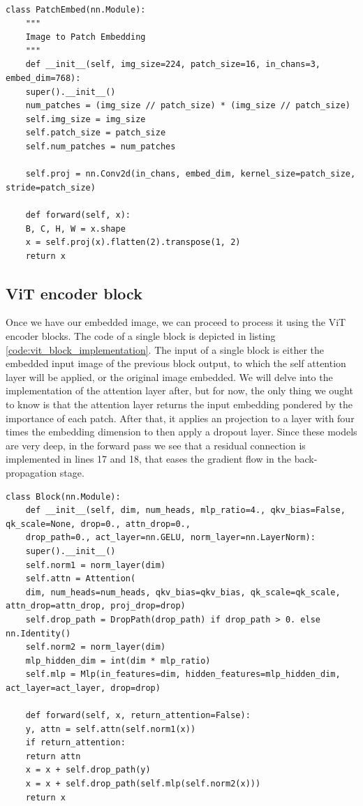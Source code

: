 \begin{lstlisting}[caption={Patch Embedding module}, label={code:patch_embedding}]
	class PatchEmbed(nn.Module):
	""" 
	Image to Patch Embedding
	"""
	def __init__(self, img_size=224, patch_size=16, in_chans=3, embed_dim=768):
	super().__init__()
	num_patches = (img_size // patch_size) * (img_size // patch_size)
	self.img_size = img_size
	self.patch_size = patch_size
	self.num_patches = num_patches
	
	self.proj = nn.Conv2d(in_chans, embed_dim, kernel_size=patch_size, stride=patch_size)
	
	def forward(self, x):
	B, C, H, W = x.shape
	x = self.proj(x).flatten(2).transpose(1, 2)
	return x
\end{lstlisting}

\subsection{ViT encoder block}
Once we have our embedded image, we can proceed to process it using the ViT encoder blocks. The code of a single block is depicted in listing \ref{code:vit_block_implementation}. The input of a single block is either the embedded input image of the previous block output, to which the self attention layer will be applied, or the original image embedded. We will delve into the implementation of the attention layer after, but for now, the only thing we ought to know is that the attention layer returns the input embedding pondered by the importance of each patch. After that, it applies an projection to a layer with four times the embedding dimension to then apply a dropout layer. Since these models are very deep, in the forward pass we see that a residual connection \cite{he2015deep} is implemented in lines 17 and 18, that eases the gradient flow in the back-propagation stage.

\begin{lstlisting}[caption={ViT blocks implementation}, label={code:vit_block_implementation}]
	class Block(nn.Module):
	def __init__(self, dim, num_heads, mlp_ratio=4., qkv_bias=False, qk_scale=None, drop=0., attn_drop=0.,
	drop_path=0., act_layer=nn.GELU, norm_layer=nn.LayerNorm):
	super().__init__()
	self.norm1 = norm_layer(dim)
	self.attn = Attention(
	dim, num_heads=num_heads, qkv_bias=qkv_bias, qk_scale=qk_scale, attn_drop=attn_drop, proj_drop=drop)
	self.drop_path = DropPath(drop_path) if drop_path > 0. else nn.Identity()
	self.norm2 = norm_layer(dim)
	mlp_hidden_dim = int(dim * mlp_ratio)
	self.mlp = Mlp(in_features=dim, hidden_features=mlp_hidden_dim, act_layer=act_layer, drop=drop)
	
	def forward(self, x, return_attention=False):
	y, attn = self.attn(self.norm1(x))
	if return_attention:
	return attn
	x = x + self.drop_path(y)
	x = x + self.drop_path(self.mlp(self.norm2(x)))
	return x
\end{lstlisting}

